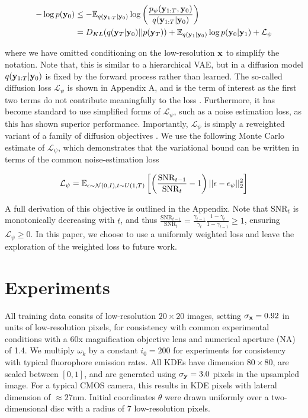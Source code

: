 \documentclass{article}
\begin{document}
\begin{align}
-\log p(\bold{y}_{0}) &\leq -\mathbb{E}_{q(\bold{y}_{1:T}|\bold{y}_{0})} \log \left(\frac{p_{\psi}(\bold{y}_{1:T},\bold{y}_{0})}{q(\bold{y}_{1:T}|\bold{y}_{0})}\right) \\
&=  D_{KL}(q(\bold{y}_{T}|\bold{y}_{0}) || p(\bold{y}_{T})) + \mathbb{E}_{q(\bold{y}_{1}|\bold{y}_{0})} \log p(\bold{y}_{0}|\bold{y}_{1}) + \mathcal{L}_{\psi}
\end{align}

where we have omitted conditioning on the low-resolution $\bold{x}$ to simplify the notation. Note that, this is similar to a hierarchical VAE, but in a diffusion model $q(\bold{y}_{1:T}|\bold{y}_{0})$ is fixed by the forward process rather than learned. The so-called diffusion loss $\mathcal{L}_{\psi}$ is shown in Appendix A, and is the term of interest as the first two terms do not contribute meaningfully to the loss \citep{Ho2020}. Furthermore, it has become standard to use simplified forms of $\mathcal{L}_{\psi}$, such as a noise estimation loss, as this has shown superior performance. Importantly, $\mathcal{L}_{\psi}$ is simply a reweighted variant of a family of diffusion objectives \citep{Kingma2021,Kingma2023}. We use the following Monte Carlo estimate of $\mathcal{L}_{\psi}$, which demonstrates that the variational bound can be written in terms of the common noise-estimation loss


\begin{equation}
\mathcal{L}_{\psi} = \mathbb{E}_{\epsilon\sim \mathcal{N}(0,I),t\sim U(1,T)}\left[\left(\frac{\mathrm{SNR}_{t-1}}{{\mathrm{SNR}_{t}}}-1\right)\lvert\lvert \bold{\epsilon}-\bold{\epsilon}_{\psi}\lvert\lvert_{2}^{2}\right]
\end{equation}

A full derivation of this objective is outlined in the Appendix. Note that $\mathrm{SNR}_{t}$ is monotonically decreasing with $t$, and thus $\frac{\mathrm{SNR}_{t-1}}{{\mathrm{SNR}_{t}}} = \frac{\gamma_{t-1}}{\gamma_{t}}\frac{1-\gamma_{t}}{1-\gamma_{t-1}} \geq 1$, ensuring $\mathcal{L}_{\psi}\geq 0$. In this paper, we choose to use a uniformly weighted loss and leave the exploration of the weighted loss to future work.

\section{Experiments}

All training data consits of low-resolution $20\times 20$ images, setting $\sigma_{\bold{x}}=0.92$ in units of low-resolution pixels, for consistency with common experimental conditions with a 60x magnification objective lens and numerical aperture (NA) of 1.4. We multiply $\omega_{k}$ by a constant $i_{0}=200$ for experiments for consistency with typical fluorophore emission rates. All KDEs have dimension $80\times 80$, are scaled between $[0,1]$, and are generated using $\sigma_{\bold{y}}=3.0$ pixels in the upsampled image. For a typical CMOS camera, this results in KDE pixels with lateral dimension of $\approx 27\mathrm{nm}$. Initial coordinates $\theta$ were drawn uniformly over a two-dimensional disc with a radius of 7 low-resolution pixels.
\end{document}
